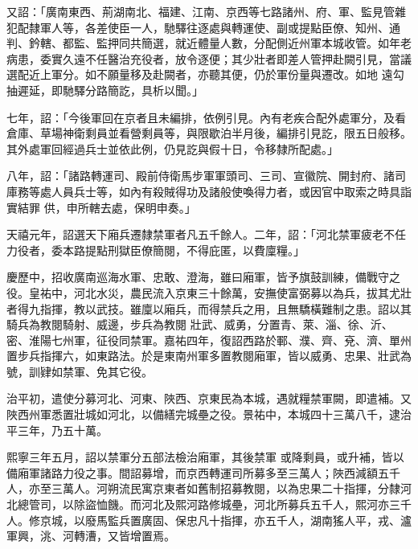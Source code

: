 \begin{pinyinscope}
 又詔：「廣南東西、荊湖南北、福建、江南、京西等七路諸州、府、軍、監見管雜犯配隸軍人等，各差使臣一人，馳驛往逐處與轉運使、副或提點臣僚、知州、通判、鈐轄、都監、監押同共簡選，就近體量人數，分配側近州軍本城收管。如年老病患，委實久遠不任醫治充役者，放令逐便；其少壯者即差人管押赴闕引見，當議選配近上軍分。如不願量移及赴闕者，亦聽其便，仍於軍份量與遷改。如地
 遠勾抽遲延，即馳驛分路簡訖，具析以聞。」



 七年，詔：「今後軍回在京者且未編排，依例引見。內有老疾合配外處軍分，及看倉庫、草場神衛剩員並看營剩員等，與限歇泊半月後，編排引見訖，限五日般移。其外處軍回經過兵士並依此例，仍見訖與假十日，令移隸所配處。」



 八年，詔：「諸路轉運司、殿前侍衛馬步軍軍頭司、三司、宣徽院、開封府、諸司庫務等處人員兵士等，如內有殺賊得功及諸般使喚得力者，或因官中取索之時具詣實結罪
 供，申所轄去處，保明申奏。」



 天禧元年，詔選天下廂兵遷隸禁軍者凡五千餘人。二年，詔：「河北禁軍疲老不任力役者，委本路提點刑獄臣僚簡閱，不得庇匿，以費廩糧。」



 慶歷中，招收廣南巡海水軍、忠敢、澄海，雖曰廂軍，皆予旗鼓訓練，備戰守之役。皇祐中，河北水災，農民流入京東三十餘萬，安撫使富弼募以為兵，拔其尤壯者得九指揮，教以武技。雖廩以廂兵，而得禁兵之用，且無驕橫難制之患。詔以其騎兵為教閱騎射、威邊，步兵為教閱
 壯武、威勇，分置青、萊、淄、徐、沂、密、淮陽七州軍，征役同禁軍。嘉祐四年，復詔西路於鄆、濮、齊、兗、濟、單州置步兵指揮六，如東路法。於是東南州軍多置教閱廂軍，皆以威勇、忠果、壯武為號，訓肄如禁軍、免其它役。



 治平初，遣使分募河北、河東、陜西、京東民為本城，遇就糧禁軍闕，即遣補。又陜西州軍悉置壯城如河北，以備繕完城壘之役。景祐中，本城四十三萬八千，逮治平三年，乃五十萬。



 熙寧三年五月，詔以禁軍分五部法檢治廂軍，其後禁軍
 或降剩員，或升補，皆以備廂軍諸路力役之事。間詔募增，而京西轉運司所募多至三萬人；陜西減額五千人，亦至三萬人。河朔流民寓京東者如舊制招募教閱，以為忠果二十指揮，分隸河北總管司，以除盜恤饑。而河北及熙河路修城壘，河北所募兵五千人，熙河亦三千人。修京城，以廢馬監兵置廣固、保忠凡十指揮，亦五千人，湖南猺人平，戎、瀘軍興，洮、河轉漕，又皆增置焉。




\end{pinyinscope}
